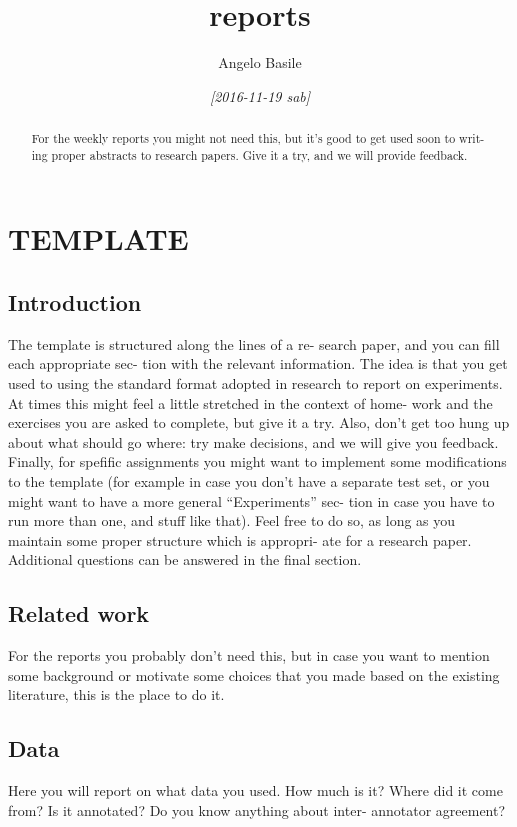 \documentclass[article,11pt,nofixltx2e]{article}
\author{Angelo Basile}
\date{\textit{[2016-11-19 sab]}}
\title{reports}
\begin{document}
\maketitle

\section{TEMPLATE}
\label{sec-1}

\begin{abstract}
For the weekly reports you might not need this, but it’s good to get used soon to writ- ing proper abstracts to research papers.  Give it a try, and we will provide feedback.
\end{abstract}

\subsection{Introduction}
\label{sec-1-1}

The template is structured along the lines of a re- search paper, and you can fill each appropriate sec- tion with the relevant information. The idea is that you get used to using the standard format adopted in research to report on experiments. At times this might feel a little stretched in the context of home- work and the exercises you are asked to complete, but give it a try. Also, don’t get too hung up about what should go where: try make decisions, and we will give you feedback. Finally, for spefific assignments you might want to implement some modifications to the template (for example in case you don’t have a separate test set, or you might want to have a more general “Experiments” sec- tion in case you have to run more than one, and stuff like that). Feel free to do so, as long as you maintain some proper structure which is appropri- ate for a research paper. Additional questions can be answered in the final section.
\subsection{Related work}
\label{sec-1-2}

For the reports you probably don’t need this, but in case you want to mention some background or motivate some choices that you made based on the existing literature, this is the place to do it.

\subsection{Data}
\label{sec-1-3}
Here you will report on what data you used. How much is it? Where did it come from? Is it annotated? Do you know anything about inter- annotator agreement?
\end{document}
